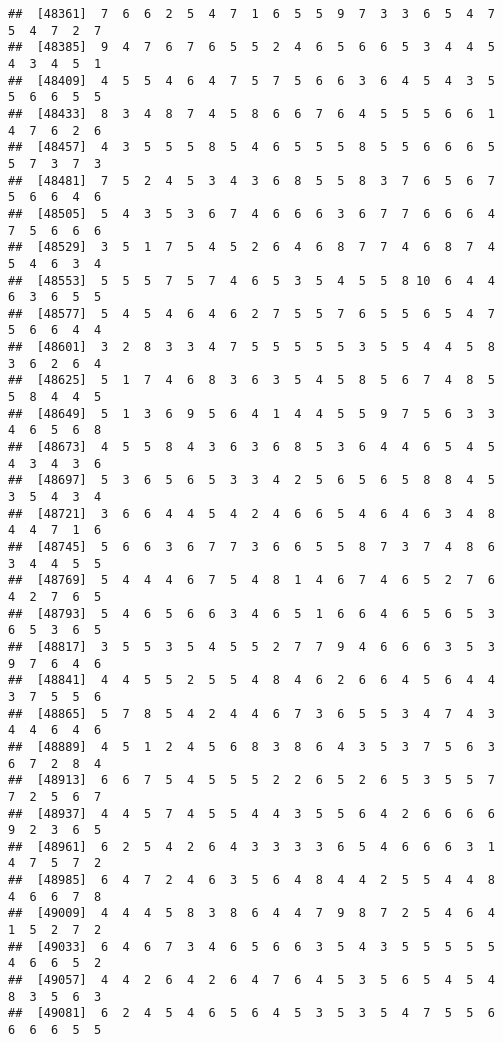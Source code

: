 \documentclass[
]{book}
\begin{document}
\begin{verbatim}
##  [48361]  7  6  6  2  5  4  7  1  6  5  5  9  7  3  3  6  5  4  7  5  4  7  2  7
##  [48385]  9  4  7  6  7  6  5  5  2  4  6  5  6  6  5  3  4  4  5  4  3  4  5  1
##  [48409]  4  5  5  4  6  4  7  5  7  5  6  6  3  6  4  5  4  3  5  5  6  6  5  5
##  [48433]  8  3  4  8  7  4  5  8  6  6  7  6  4  5  5  5  6  6  1  4  7  6  2  6
##  [48457]  4  3  5  5  5  8  5  4  6  5  5  5  8  5  5  6  6  6  5  5  7  3  7  3
##  [48481]  7  5  2  4  5  3  4  3  6  8  5  5  8  3  7  6  5  6  7  5  6  6  4  6
##  [48505]  5  4  3  5  3  6  7  4  6  6  6  3  6  7  7  6  6  6  4  7  5  6  6  6
##  [48529]  3  5  1  7  5  4  5  2  6  4  6  8  7  7  4  6  8  7  4  5  4  6  3  4
##  [48553]  5  5  5  7  5  7  4  6  5  3  5  4  5  5  8 10  6  4  4  6  3  6  5  5
##  [48577]  5  4  5  4  6  4  6  2  7  5  5  7  6  5  5  6  5  4  7  5  6  6  4  4
##  [48601]  3  2  8  3  3  4  7  5  5  5  5  5  3  5  5  4  4  5  8  3  6  2  6  4
##  [48625]  5  1  7  4  6  8  3  6  3  5  4  5  8  5  6  7  4  8  5  5  8  4  4  5
##  [48649]  5  1  3  6  9  5  6  4  1  4  4  5  5  9  7  5  6  3  3  4  6  5  6  8
##  [48673]  4  5  5  8  4  3  6  3  6  8  5  3  6  4  4  6  5  4  5  4  3  4  3  6
##  [48697]  5  3  6  5  6  5  3  3  4  2  5  6  5  6  5  8  8  4  5  3  5  4  3  4
##  [48721]  3  6  6  4  4  5  4  2  4  6  6  5  4  6  4  6  3  4  8  4  4  7  1  6
##  [48745]  5  6  6  3  6  7  7  3  6  6  5  5  8  7  3  7  4  8  6  3  4  4  5  5
##  [48769]  5  4  4  4  6  7  5  4  8  1  4  6  7  4  6  5  2  7  6  4  2  7  6  5
##  [48793]  5  4  6  5  6  6  3  4  6  5  1  6  6  4  6  5  6  5  3  6  5  3  6  5
##  [48817]  3  5  5  3  5  4  5  5  2  7  7  9  4  6  6  6  3  5  3  9  7  6  4  6
##  [48841]  4  4  5  5  2  5  5  4  8  4  6  2  6  6  4  5  6  4  4  3  7  5  5  6
##  [48865]  5  7  8  5  4  2  4  4  6  7  3  6  5  5  3  4  7  4  3  4  4  6  4  6
##  [48889]  4  5  1  2  4  5  6  8  3  8  6  4  3  5  3  7  5  6  3  6  7  2  8  4
##  [48913]  6  6  7  5  4  5  5  5  2  2  6  5  2  6  5  3  5  5  7  7  2  5  6  7
##  [48937]  4  4  5  7  4  5  5  4  4  3  5  5  6  4  2  6  6  6  6  9  2  3  6  5
##  [48961]  6  2  5  4  2  6  4  3  3  3  3  6  5  4  6  6  6  3  1  4  7  5  7  2
##  [48985]  6  4  7  2  4  6  3  5  6  4  8  4  4  2  5  5  4  4  8  4  6  6  7  8
##  [49009]  4  4  4  5  8  3  8  6  4  4  7  9  8  7  2  5  4  6  4  1  5  2  7  2
##  [49033]  6  4  6  7  3  4  6  5  6  6  3  5  4  3  5  5  5  5  5  4  6  6  5  2
##  [49057]  4  4  2  6  4  2  6  4  7  6  4  5  3  5  6  5  4  5  4  8  3  5  6  3
##  [49081]  6  2  4  5  4  6  5  6  4  5  3  5  3  5  4  7  5  5  6  6  6  6  5  5

\end{verbatim}
\end{document}
